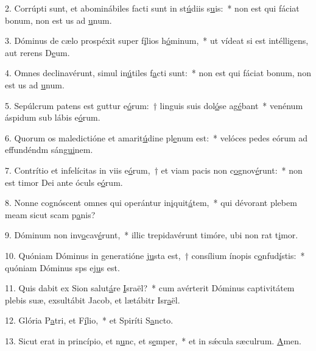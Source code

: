 2. Corrúpti sunt, et abominábiles facti sunt in st\uline{ú}diis s\uline{u}is:~* non est qui fáciat bonum, non est us ad \uline{u}num.\par 
3. Dóminus de cælo prospéxit super f\uline{í}lios h\uline{ó}minum,~* ut vídeat si est intélligens, aut rerens D\uline{e}um.\par 
4. Omnes declinavérunt, simul in\uline{ú}tiles f\uline{a}cti sunt:~* non est qui fáciat bonum, non est us ad \uline{u}num.\par 
5. Sepúlcrum patens est guttur e\uline{ó}rum:~† linguis suis dol\uline{ó}se ag\uline{é}bant~* venénum áspidum sub lábis e\uline{ó}rum.\par 
6. Quorum os maledictióne et amarit\uline{ú}dine pl\uline{e}num est:~* velóces pedes eórum ad effundéndm sán\uline{gui}nem.\par 
7. Contrítio et infelícitas in viis e\uline{ó}rum,~† et viam pacis non c\uline{o}gnov\uline{é}runt:~* non est timor Dei ante óculs e\uline{ó}rum.\par 
8. Nonne cognóscent omnes qui operántur in\uline{i}quit\uline{á}tem,~* qui dévorant plebem meam sicut scam p\uline{a}nis?\par 
9. Dóminum non inv\uline{o}cav\uline{é}runt,~* illic trepidavérunt timóre, ubi non rat t\uline{i}mor.\par 
10. Quóniam Dóminus in generatióne \uline{ju}sta est,~† consílium ínopis c\uline{o}nfud\uline{í}stis:~* quóniam Dóminus sps ej\uline{u}s est.\par 
11. Quis dabit ex Sion salut\uline{á}re \uline{I}sraël?~* cum avérterit Dóminus captivitátem plebis suæ, exsultábit Jacob, et lætábitr Isr\uline{a}ël.\par 
12. Glória P\uline{a}tri, et F\uline{í}lio,~* et Spiríti S\uline{a}ncto.\par 
13. Sicut erat in princípio, et n\uline{u}nc, et s\uline{e}mper,~* et in sǽcula sæculrum. \uline{A}men.\par 
